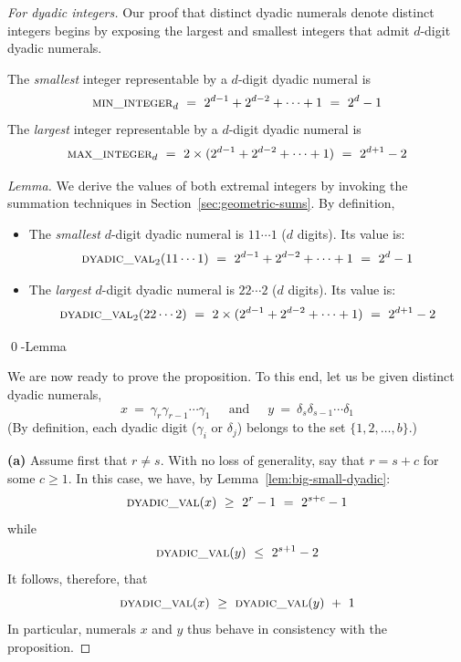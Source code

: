 \begin{proof}[For dyadic integers]
Our proof that distinct dyadic numerals denote distinct integers begins by exposing the largest and smallest integers that admit $d$-digit dyadic numerals.

\begin{lemma}
\label{lem:big-small-dyadic}
The {\em smallest} integer representable by a $d$-digit dyadic numeral is 
\[ \mbox{\sc min\_integer}_d \ = \  2^{d-1} + 2^{d-2} + \cdots + 1 \ = \ 2^d - 1 \]
The {\em largest} integer representable by a $d$-digit dyadic numeral is
\[ \mbox{\sc max\_integer}_d \ = \ 2 \times (2^{d-1} + 2^{d-2} + \cdots + 1) \ = \ 2^{d+1} - 2 \]
\end{lemma}

\begin{proof}[Lemma]
We derive the values of both extremal integers by invoking the summation techniques in Section~\ref{sec:geometric-sums}.  By definition,
\begin{itemize}
\item
The {\em smallest} $d$-digit dyadic numeral is $11 \cdots 1$ ($d$ digits).  Its value is:
\[ \mbox{\sc dyadic\_val}_2(11 \cdots 1)
 \ = \ 2^{d-1} + 2^{d-2} + \cdots + 1 \ = \ 2^d - 1 \]
\medskip\item
The {\em largest} $d$-digit dyadic numeral is  $22 \cdots 2$ ($d$ digits).  Its value is:
\[ \mbox{\sc dyadic\_val}_2(22 \cdots 2)
\ = \ 2 \times (2^{d-1} + 2^{d-2} + \cdots + 1) \ = \ 2^{d+1} - 2 \]
\end{itemize}
\qed-Lemma
\end{proof}

\bigskip

We are now ready to prove the proposition.  To this end, let us be given distinct dyadic numerals,
\[
x \ = \ \gamma_r \gamma_{r-1} \cdots \gamma_1
 \ \ \ \ \ \mbox{ and } \ \ \ \ \
y \ = \ \delta_s \delta_{s-1} \cdots \delta_1
\]
(By definition, each dyadic digit ($\gamma_i$ or $\delta_j$) belongs to the set $\{1, 2, \ldots, b\}$.)

\smallskip

{\bf (a)} Assume first that $r \neq s$.  With no loss of generality, say that $r = s +c$ for some $c \geq 1$.  In this case, we have, by Lemma~\ref{lem:big-small-dyadic}:
\[ \mbox{\sc dyadic\_val}(x) \ \geq \ 2^{r} - 1 \ = \ 2^{s+c} -1 \]
while
\[ \mbox{\sc dyadic\_val}(y) \ \leq \ 2^{s+1} - 2 \]
It follows, therefore, that
\[ \mbox{\sc dyadic\_val}(x) \ \geq \ \mbox{\sc dyadic\_val}(y) \ + \ 1 \]
In particular, numerals $x$ and $y$ thus behave in consistency with the proposition.


\end{proof}

